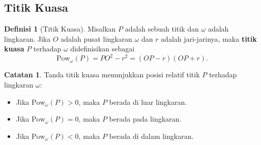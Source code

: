 \documentclass[aspectratio=169]{beamer}
\theoremstyle{definition}
\newtheorem{definisi}{Definisi}
\newtheorem{catatan}{Catatan}
\begin{document}
\subsection{Titik Kuasa}

\begin{frame}{\insertsection}{\insertsubsection}

  \begin{definisi}[Titik Kuasa]
    Misalkan $P$ adalah sebuah titik dan $\omega$ adalah lingkaran.
    Jika $O$ adalah pusat lingkaran $\omega$ dan $r$ adalah jari-jarinya, maka \textbf{titik kuasa} $P$ terhadap $\omega$ didefinisikan sebagai
    \[
      \text{Pow}_{\omega}(P) = PO^2 - r^2 = (OP-r)(OP+r).
    \]
  \end{definisi}

  \begin{catatan}
    Tanda titik kuasa menunjukkan posisi relatif titik $P$ terhadap lingkaran $\omega$:
    \begin{itemize}
      \item Jika $\text{Pow}_{\omega}(P) > 0$, maka $P$ berada di luar lingkaran.
      \item Jika $\text{Pow}_{\omega}(P) = 0$, maka $P$ berada pada lingkaran.
      \item Jika $\text{Pow}_{\omega}(P) < 0$, maka $P$ berada di dalam lingkaran.
    \end{itemize}
  \end{catatan}
\end{frame}
\end{document}
